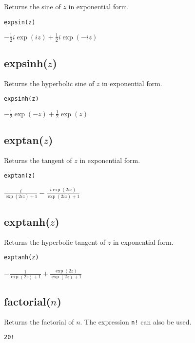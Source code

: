 Returns the sine of $z$ in exponential form.

{\color{blue}
\begin{verbatim}
expsin(z)
\end{verbatim}
}

\noindent
$\displaystyle -\tfrac{1}{2}i\exp(iz)+\tfrac{1}{2}i\exp(-iz)$

\subsection*{expsinh($z$)}

Returns the hyperbolic sine of $z$ in exponential form.

{\color{blue}
\begin{verbatim}
expsinh(z)
\end{verbatim}
}

\noindent
$\displaystyle -\tfrac{1}{2}\exp(-z)+\tfrac{1}{2}\exp(z)$

\subsection*{exptan($z$)}

Returns the tangent of $z$ in exponential form.

{\color{blue}
\begin{verbatim}
exptan(z)
\end{verbatim}
}

\noindent
$\displaystyle \frac{i}{\exp(2iz)+1}-\frac{i\exp(2iz)}{\exp(2iz)+1}$

\subsection*{exptanh($z$)}

Returns the hyperbolic tangent of $z$ in exponential form.

{\color{blue}
\begin{verbatim}
exptanh(z)
\end{verbatim}
}

\noindent
$\displaystyle -\frac{1}{\exp(2z)+1}+\frac{\exp(2z)}{\exp(2z)+1}$

\subsection*{factorial($n$)}

Returns the factorial of $n$.
The expression {\tt n!} can also be used.

{\color{blue}
\begin{verbatim}
20!
\end{verbatim}
}

